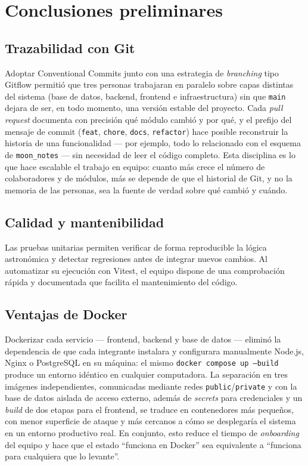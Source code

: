 \chapter{Conclusiones preliminares}

\section{Trazabilidad con Git}
Adoptar Conventional Commits junto con una estrategia de \emph{branching} tipo Gitflow permitió que tres personas trabajaran en paralelo sobre capas distintas del sistema (base de datos, backend, frontend e infraestructura) sin que \texttt{main} dejara de ser, en todo momento, una versión estable del proyecto. Cada \emph{pull request} documenta con precisión qué módulo cambió y por qué, y el prefijo del mensaje de commit (\texttt{feat}, \texttt{chore}, \texttt{docs}, \texttt{refactor}) hace posible reconstruir la historia de una funcionalidad --- por ejemplo, todo lo relacionado con el esquema de \texttt{moon\_notes} --- sin necesidad de leer el código completo. Esta disciplina es lo que hace escalable el trabajo en equipo: cuanto más crece el número de colaboradores y de módulos, más se depende de que el historial de Git, y no la memoria de las personas, sea la fuente de verdad sobre qué cambió y cuándo.

\section{Calidad y mantenibilidad}
Las pruebas unitarias permiten verificar de forma reproducible la lógica
astronómica y detectar regresiones antes de integrar nuevos cambios. Al
automatizar su ejecución con Vitest, el equipo dispone de una comprobación
rápida y documentada que facilita el mantenimiento del código.

\section{Ventajas de Docker}
Dockerizar cada servicio --- frontend, backend y base de datos --- eliminó la dependencia de que cada integrante instalara y configurara manualmente Node.js, Nginx o PostgreSQL en su máquina: el mismo \texttt{docker compose up --build} produce un entorno idéntico en cualquier computadora. La separación en tres imágenes independientes, comunicadas mediante redes \texttt{public}/\texttt{private} y con la base de datos aislada de acceso externo, además de \emph{secrets} para credenciales y un \emph{build} de dos etapas para el frontend, se traduce en contenedores más pequeños, con menor superficie de ataque y más cercanos a cómo se desplegaría el sistema en un entorno productivo real. En conjunto, esto reduce el tiempo de \emph{onboarding} del equipo y hace que el estado ``funciona en Docker'' sea equivalente a ``funciona para cualquiera que lo levante''.
